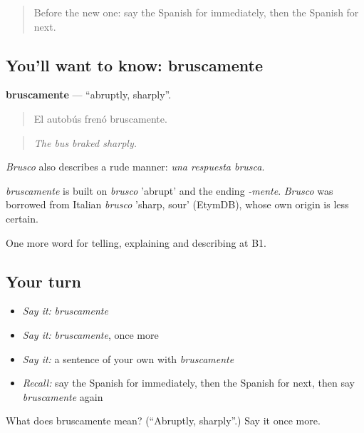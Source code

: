 \label{lesson:ES-C534-bruscamente}



\begin{quote}
Before the new one: say the Spanish for immediately, then the Spanish for next.
\end{quote}

\subsection*{You'll want to know: bruscamente}
\textbf{bruscamente} — \textquotedblleft{}abruptly, sharply\textquotedblright{}.

\begin{quote}
El autobús frenó bruscamente.
\end{quote}

\begin{quote}
\emph{The bus braked sharply.}
\end{quote}

\emph{Brusco} also describes a rude manner: \emph{una respuesta brusca}.

\begin{cousinweb}
\emph{bruscamente} is built on \emph{brusco} 'abrupt' and the ending \emph{-mente}. \emph{Brusco} was borrowed from Italian \emph{brusco} 'sharp, sour' (EtymDB), whose own origin is less certain.
\end{cousinweb}

\begin{grammarlens}[title={What you've built}]
One more word for telling, explaining and describing at B1.
\end{grammarlens}

\subsection*{Your turn}
\begin{itemize}
\raggedright
  \item \emph{Say it:} \emph{bruscamente}
  \item \emph{Say it:} \emph{bruscamente}, once more
  \item \emph{Say it:} a sentence of your own with \emph{bruscamente}
  \item \emph{Recall:} say the Spanish for immediately, then the Spanish for next, then say \emph{bruscamente} again
\end{itemize}

\begin{tcolorbox}[breakable,colback=teal!4,colframe=teal!35!black,title={Before you move on}]
What does bruscamente mean? (\textquotedblleft{}Abruptly, sharply\textquotedblright{}.) Say it once more.
\end{tcolorbox}

